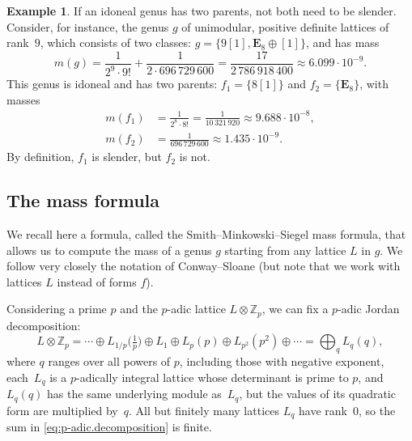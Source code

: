 \documentclass[a4paper]{amsart}
\theoremstyle{definition}
\newtheorem{example}[definition]{Example}
\theoremstyle{plain}
\newcommand{\IZ}{\mathbb{Z}}
\newcommand{\bE}{\mathbf{E}}
\begin{document}
\begin{example}
    If an idoneal genus has two parents, not both need to be slender.  
    Consider, for instance, the genus \(g\) of unimodular, positive definite lattices of rank~\(9\), which consists of two classes: \(g = \{9[1], \bE_8 \oplus [1]\}\), and has mass
    \[
        m(g) = \frac{1}{2^9 \cdot 9!} + \frac{1}{2 \cdot 696\,729\,600} = \frac{17}{2\,786\,918\,400} \approx 6.099 \cdot 10^{-9}.
    \]
    This genus is idoneal and has two parents: \(f_1 = \{8[1]\}\) and \(f_2 = \{\bE_8\}\), with masses
    \begin{align*}
        m(f_1) & = \frac{1}{2^8 \cdot 8!} = \frac{1}{10\,321\,920} \approx 9.688 \cdot 10^{-8}, \\  
        m(f_2) & = \frac{1}{696\,729\,600} \approx 1.435 \cdot 10^{-9}.
    \end{align*}
    By definition, \(f_1\) is slender, but \(f_2\) is not.
\end{example}



\subsection{The mass formula} \label{subsec:mass.formula}

We recall here a formula, called the Smith--Minkowski--Siegel mass formula, that allows us to compute the mass of a genus \(g\) starting from any lattice \(L\) in \(g\). 
We follow very closely the notation of Conway--Sloane \cite{ConwaySloane88} (but note that we work with lattices \(L\) instead of forms \(f\)).

Considering a prime $p$ and the $p$-adic lattice \(L\otimes \IZ_p\), we can fix a \(p\)-adic Jordan decomposition:
\begin{equation} \label{eq:p-adic.decomposition}
    L \otimes \IZ_p= \cdots \oplus L_{1/p}\big( \tfrac{1}{p} \big) \oplus L_1 \oplus L_p(p) \oplus L_{p^2}(p^2) \oplus \cdots = \bigoplus_q L_q(q),
\end{equation}
where \(q\) ranges over all powers of \(p\), including those with negative exponent,  each~\(L_q\) is a \(p\)-adically integral lattice whose determinant is prime to \(p\), and \(L_q(q)\) has the same underlying module as~\(L_q\), but the values of its quadratic form are multiplied by~\(q\).
All but finitely many lattices \(L_q\) have rank~\(0\), so the sum in \eqref{eq:p-adic.decomposition} is finite.
\end{document}
